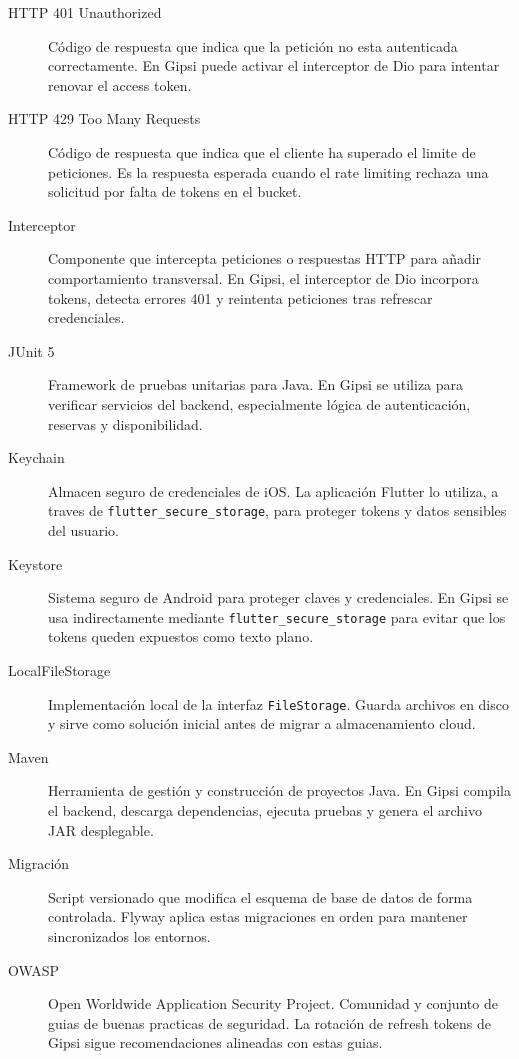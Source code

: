 \documentclass[12pt,a4paper,twoside]{report}
\begin{document}
\begin{description}
  \item[HTTP 401 Unauthorized]
  C\'odigo de respuesta que indica que la petici\'on no esta autenticada correctamente.
  En Gipsi puede activar el interceptor de Dio para intentar renovar el access token.

  \item[HTTP 429 Too Many Requests]
  C\'odigo de respuesta que indica que el cliente ha superado el limite de peticiones.
  Es la respuesta esperada cuando el rate limiting rechaza una solicitud por falta de
  tokens en el bucket.

  \item[Interceptor]
  Componente que intercepta peticiones o respuestas HTTP para a\~nadir comportamiento
  transversal. En Gipsi, el interceptor de Dio incorpora tokens, detecta errores 401 y
  reintenta peticiones tras refrescar credenciales.

  \item[JUnit 5]
  Framework de pruebas unitarias para Java. En Gipsi se utiliza para verificar servicios
  del backend, especialmente l\'ogica de autenticaci\'on, reservas y disponibilidad.

  \item[Keychain]
  Almacen seguro de credenciales de iOS. La aplicaci\'on Flutter lo utiliza, a traves de
  \texttt{flutter\_secure\_storage}, para proteger tokens y datos sensibles del usuario.

  \item[Keystore]
  Sistema seguro de Android para proteger claves y credenciales. En Gipsi se usa
  indirectamente mediante \texttt{flutter\_secure\_storage} para evitar que los tokens
  queden expuestos como texto plano.

  \item[LocalFileStorage]
  Implementaci\'on local de la interfaz \texttt{FileStorage}. Guarda archivos en disco y
  sirve como soluci\'on inicial antes de migrar a almacenamiento cloud.

  \item[Maven]
  Herramienta de gesti\'on y construcci\'on de proyectos Java. En Gipsi compila el backend,
  descarga dependencias, ejecuta pruebas y genera el archivo JAR desplegable.

  \item[Migraci\'on]
  Script versionado que modifica el esquema de base de datos de forma controlada. Flyway
  aplica estas migraciones en orden para mantener sincronizados los entornos.

  \item[OWASP]
  Open Worldwide Application Security Project. Comunidad y conjunto de guias de buenas
  practicas de seguridad. La rotaci\'on de refresh tokens de Gipsi sigue recomendaciones
  alineadas con estas guias.


\end{description}
\end{document}
